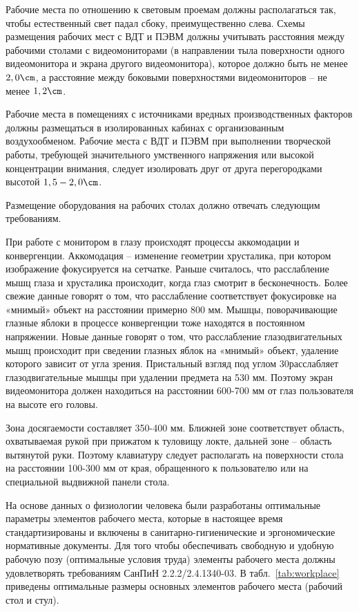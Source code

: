 Рабочие места по отношению к световым проемам должны располагаться так, чтобы естественный свет падал сбоку, преимущественно слева. Схемы размещения рабочих мест с ВДТ и ПЭВМ должны учитывать расстояния между рабочими столами с видеомониторами (в направлении тыла поверхности одного видеомонитора и экрана другого видеомонитора), которое должно быть не менее $2,0 \cm$, а расстояние между боковыми поверхностями видеомониторов -- не менее $1,2 \cm$.

Рабочие места в помещениях с источниками вредных производственных факторов должны размещаться в изолированных кабинах с организованным воздухообменом. Рабочие места с ВДТ и ПЭВМ при выполнении творческой работы, требующей значительного умственного напряжения или высокой концентрации внимания, следует изолировать друг от друга перегородками высотой $1,5 - 2,0 \cm$.

Размещение оборудования на рабочих столах должно отвечать следующим требованиям.

При работе с монитором в глазу происходят процессы аккомодации и конвергенции. Аккомодация -- изменение геометрии хрусталика, при котором изображение фокусируется на сетчатке. Раньше считалось, что расслабление мышц глаза и хрусталика происходит, когда глаз смотрит в бесконечность. Более свежие данные говорят о том, что расслабление соответствует фокусировке на «мнимый» объект на расстоянии примерно 800 мм. Мышцы, поворачивающие глазные яблоки в процессе конвергенции тоже находятся в постоянном напряжении. Новые данные говорят о том, что расслабление глазодвигательных мышц происходит при сведении глазных яблок на «мнимый» объект, удаление которого зависит от угла зрения. Пристальный взгляд под углом 30\textdegree расслабляет глазодвигательные мышцы при удалении предмета на 530 мм. Поэтому экран видеомонитора должен находиться на расстоянии 600-700 мм от глаз пользователя на высоте его головы.

Зона досягаемости составляет 350-400 мм. Ближней зоне соответствует область, охватываемая рукой при прижатом к туловищу локте, дальней зоне -- область вытянутой руки. Поэтому клавиатуру следует располагать на поверхности стола на расстоянии 100-300 мм от края, обращенного к пользователю или на специальной выдвижной панели стола.

На основе данных о физиологии человека были разработаны оптимальные параметры элементов рабочего места, которые в настоящее время стандартизированы и включены в санитарно-гигиенические и эргономические нормативные документы. Для того чтобы обеспечивать свободную и удобную рабочую позу (оптимальные условия труда) элементы рабочего места должны удовлетворять требованиям СанПиН 2.2.2/2.4.1340-03. В табл.~\ref{tab:workplace} приведены оптимальные размеры основных элементов рабочего места (рабочий стол и стул).

